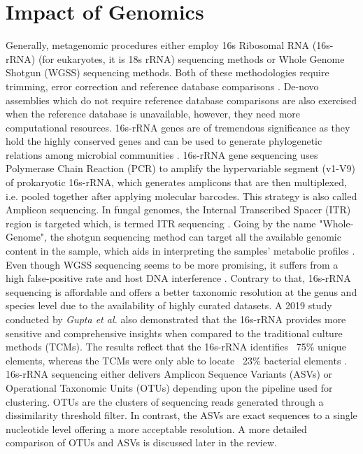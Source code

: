 \section{Impact of Genomics}
Generally, metagenomic procedures either employ 16s Ribosomal RNA (16s-rRNA) (for eukaryotes, it is 18s rRNA) sequencing methods or Whole Genome Shotgun (WGSS) sequencing methods. Both of these methodologies require trimming, error correction and reference database comparisons \cite{ref3}. De-novo assemblies which do not require reference database comparisons are also exercised when the reference database is unavailable, however, they need more computational resources. 16s-rRNA genes are of tremendous significance as they hold the highly conserved genes and can be used to generate phylogenetic relations among microbial communities \cite{ref3}. 16s-rRNA gene sequencing uses Polymerase Chain Reaction (PCR) to amplify the hypervariable segment (v1-V9) of prokaryotic 16s-rRNA, which generates amplicons that are then multiplexed, i.e. pooled together after applying molecular barcodes. This strategy is also called Amplicon sequencing. In fungal genomes, the Internal Transcribed Spacer (ITR) region is targeted which, is termed ITR sequencing \cite{ref3}. Going by the name "Whole-Genome", the shotgun sequencing method can target all the available genomic content in the sample, which aids in interpreting the samples' metabolic profiles \cite{ref4}. Even though WGSS sequencing seems to be more promising, it suffers from a high false-positive rate and host DNA interference \cite{ref4}. Contrary to that, 16s-rRNA sequencing is affordable and offers a better taxonomic resolution at the genus and species level due to the availability of highly curated datasets. A 2019 study conducted by \emph{Gupta et al.} also demonstrated that the 16s-rRNA provides more sensitive and comprehensive insights when compared to the traditional culture methods (TCMs). The results reflect that the 16s-rRNA identifies ~75\% unique elements, whereas the TCMs were only able to locate ~23\% bacterial elements \cite{ref5}. 16s-rRNA sequencing either delivers Amplicon Sequence Variants (ASVs) or Operational Taxonomic Units (OTUs) depending upon the pipeline used for clustering. OTUs are the clusters of sequencing reads generated through a dissimilarity threshold filter. In contrast, the ASVs are exact sequences to a single nucleotide level offering a more acceptable resolution. A more detailed comparison of OTUs and ASVs is discussed later in the review.

